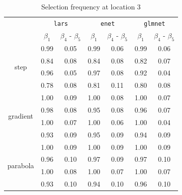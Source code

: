 \documentclass[authoryear, review, 11pt]{elsarticle}
\begin{document}
		\begin{table}[ht]
		\begin{center}
		\begin{tabular}{ccc|cc|cc}
		& \multicolumn{2}{c}{\texttt{lars}} & \multicolumn{2}{c}{\texttt{enet}} & \multicolumn{2}{c}{\texttt{glmnet}} \\
		& $\beta_1$ & $\beta_4$ - $\beta_5$ & $\beta_1$ & $\beta_4$ - $\beta_5$ & $\beta_1$ & $\beta_4$ - $\beta_5$ \\ 
		  \cline{2-7}
		  \multirow{4}{*}{step} & 0.99 & 0.05 & 0.99 & 0.06 & 0.99 & 0.06 \\ 
		  & 0.84 & 0.08 & 0.84 & 0.08 & 0.82 & 0.07 \\ 
		  & 0.96 & 0.05 & 0.97 & 0.08 & 0.92 & 0.04 \\ 
		  & 0.78 & 0.08 & 0.81 & 0.11 & 0.80 & 0.08 \\ 
		  \cline{2-7}
		  \multirow{4}{*}{gradient} & 1.00 & 0.09 & 1.00 & 0.08 & 1.00 & 0.07 \\ 
		  & 0.98 & 0.08 & 0.95 & 0.08 & 0.96 & 0.07 \\ 
		  & 1.00 & 0.07 & 1.00 & 0.06 & 1.00 & 0.04 \\ 
		  & 0.93 & 0.09 & 0.95 & 0.09 & 0.94 & 0.09 \\ 
		  \cline{2-7}
		  \multirow{4}{*}{parabola} & 1.00 & 0.09 & 1.00 & 0.09 & 1.00 & 0.09 \\ 
		  & 0.96 & 0.10 & 0.97 & 0.09 & 0.97 & 0.10 \\ 
		  & 1.00 & 0.08 & 1.00 & 0.07 & 1.00 & 0.07 \\ 
		  & 0.93 & 0.10 & 0.94 & 0.10 & 0.96 & 0.10 \\ 
		  \end{tabular}
		\caption{Selection frequency at location 3\label{table:loc3-selection}}
		\end{center}
		\end{table}
\end{document}
